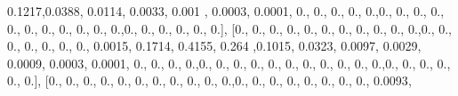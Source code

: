 \documentclass[
]{book}
\newenvironment{Shaded}{\begin{snugshade}}{\end{snugshade}}
\newcommand{\FloatTok}[1]{\textcolor[rgb]{0.00,0.00,0.81}{#1}}
\newcommand{\NormalTok}[1]{#1}
\begin{document}
\begin{Shaded}
\begin{Highlighting}[]
\FloatTok{0.1217}\NormalTok{,}\FloatTok{0.0388}\NormalTok{, }\FloatTok{0.0114}\NormalTok{, }\FloatTok{0.0033}\NormalTok{, }\FloatTok{0.001}\NormalTok{ , }\FloatTok{0.0003}\NormalTok{, }\FloatTok{0.0001}\NormalTok{, }\FloatTok{0.}\NormalTok{, }\FloatTok{0.}\NormalTok{, }\FloatTok{0.}\NormalTok{, }\FloatTok{0.}\NormalTok{, }\FloatTok{0.}\NormalTok{,}\FloatTok{0.}\NormalTok{,}
\FloatTok{0.}\NormalTok{, }\FloatTok{0.}\NormalTok{, }\FloatTok{0.}\NormalTok{, }\FloatTok{0.}\NormalTok{, }\FloatTok{0.}\NormalTok{, }\FloatTok{0.}\NormalTok{, }\FloatTok{0.}\NormalTok{, }\FloatTok{0.}\NormalTok{, }\FloatTok{0.}\NormalTok{, }\FloatTok{0.}\NormalTok{,}\FloatTok{0.}\NormalTok{, }\FloatTok{0.}\NormalTok{, }\FloatTok{0.}\NormalTok{, }\FloatTok{0.}\NormalTok{, }\FloatTok{0.}\NormalTok{, }\FloatTok{0.}\NormalTok{], [}\FloatTok{0.}\NormalTok{, }\FloatTok{0.}\NormalTok{, }\FloatTok{0.}\NormalTok{, }\FloatTok{0.}\NormalTok{,}
\FloatTok{0.}\NormalTok{, }\FloatTok{0.}\NormalTok{, }\FloatTok{0.}\NormalTok{, }\FloatTok{0.}\NormalTok{, }\FloatTok{0.}\NormalTok{, }\FloatTok{0.}\NormalTok{, }\FloatTok{0.}\NormalTok{,}\FloatTok{0.}\NormalTok{, }\FloatTok{0.}\NormalTok{, }\FloatTok{0.}\NormalTok{, }\FloatTok{0.}\NormalTok{, }\FloatTok{0.}\NormalTok{, }\FloatTok{0.}\NormalTok{, }\FloatTok{0.}\NormalTok{, }\FloatTok{0.0015}\NormalTok{, }\FloatTok{0.1714}\NormalTok{, }\FloatTok{0.4155}\NormalTok{,}
\FloatTok{0.264}\NormalTok{ ,}\FloatTok{0.1015}\NormalTok{, }\FloatTok{0.0323}\NormalTok{, }\FloatTok{0.0097}\NormalTok{, }\FloatTok{0.0029}\NormalTok{, }\FloatTok{0.0009}\NormalTok{, }\FloatTok{0.0003}\NormalTok{, }\FloatTok{0.0001}\NormalTok{, }\FloatTok{0.}\NormalTok{, }\FloatTok{0.}\NormalTok{, }\FloatTok{0.}\NormalTok{,}
\FloatTok{0.}\NormalTok{,}\FloatTok{0.}\NormalTok{, }\FloatTok{0.}\NormalTok{, }\FloatTok{0.}\NormalTok{, }\FloatTok{0.}\NormalTok{, }\FloatTok{0.}\NormalTok{, }\FloatTok{0.}\NormalTok{, }\FloatTok{0.}\NormalTok{, }\FloatTok{0.}\NormalTok{, }\FloatTok{0.}\NormalTok{, }\FloatTok{0.}\NormalTok{, }\FloatTok{0.}\NormalTok{,}\FloatTok{0.}\NormalTok{, }\FloatTok{0.}\NormalTok{, }\FloatTok{0.}\NormalTok{, }\FloatTok{0.}\NormalTok{, }\FloatTok{0.}\NormalTok{, }\FloatTok{0.}\NormalTok{], [}\FloatTok{0.}\NormalTok{, }\FloatTok{0.}\NormalTok{,}
\FloatTok{0.}\NormalTok{, }\FloatTok{0.}\NormalTok{, }\FloatTok{0.}\NormalTok{, }\FloatTok{0.}\NormalTok{, }\FloatTok{0.}\NormalTok{, }\FloatTok{0.}\NormalTok{, }\FloatTok{0.}\NormalTok{, }\FloatTok{0.}\NormalTok{, }\FloatTok{0.}\NormalTok{,}\FloatTok{0.}\NormalTok{, }\FloatTok{0.}\NormalTok{, }\FloatTok{0.}\NormalTok{, }\FloatTok{0.}\NormalTok{, }\FloatTok{0.}\NormalTok{, }\FloatTok{0.}\NormalTok{, }\FloatTok{0.}\NormalTok{, }\FloatTok{0.}\NormalTok{, }\FloatTok{0.0093}\NormalTok{,}

\end{Highlighting}
\end{Shaded}
\end{document}
